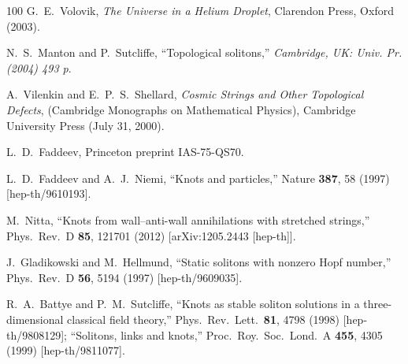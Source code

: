 \documentclass[aps,prd,preprint,
superscriptaddress]{revtex4}
\newcommand {\1}[1]{\frac{1}{#1}}
\newcommand {\2}[1]{\frac{i}{#1}}
\begin{document}

\newcommand{\J}[4]{{\sl #1} {\bf #2} (#3) #4}
\newcommand{\andJ}[3]{{\bf #1} (#2) #3}
\newcommand{\AP}{Ann.\ Phys.\ (N.Y.)}
\newcommand{\MPL}{Mod.\ Phys.\ Lett.}
\newcommand{\NP}{Nucl.\ Phys.}
\newcommand{\PL}{Phys.\ Lett.}
\newcommand{\PR}{ Phys.\ Rev.}
\newcommand{\PRL}{Phys.\ Rev.\ Lett.}
\newcommand{\PTP}{Prog.\ Theor.\ Phys.}
\newcommand{\hep}[1]{{\tt hep-th/{#1}}}



\begin{thebibliography}{100}
G.~E.~Volovik,
{\it The Universe in a Helium Droplet}, 
Clarendon Press,  Oxford (2003).

  N.~S.~Manton and P.~Sutcliffe,
  ``Topological solitons,''
{\it  Cambridge, UK: Univ. Pr. (2004) 493 p}.

A.~Vilenkin and E.~P.~S.~Shellard, 
{\it Cosmic Strings and Other Topological Defects}, (Cambridge Monographs on Mathematical Physics), Cambridge University Press (July 31, 2000).

L.~D.~Faddeev, Princeton preprint IAS-75-QS70.

  L.~D.~Faddeev and A.~J.~Niemi,
  ``Knots and particles,''  Nature {\bf 387}, 58 (1997)  [hep-th/9610193].  %

  M.~Nitta,
  ``Knots from wall--anti-wall annihilations with stretched strings,''  Phys.\ Rev.\ D {\bf 85}, 121701 (2012)  [arXiv:1205.2443 [hep-th]].  %

  J.~Gladikowski and M.~Hellmund,
  ``Static solitons with nonzero Hopf number,''  Phys.\ Rev.\ D {\bf 56}, 5194 (1997)  [hep-th/9609035].  %

  R.~A.~Battye and P.~M.~Sutcliffe,
  ``Knots as stable soliton solutions in a three-dimensional classical field theory,''  Phys.\ Rev.\ Lett.\  {\bf 81}, 4798 (1998)  [hep-th/9808129];  %
  ``Solitons, links and knots,''  Proc.\ Roy.\ Soc.\ Lond.\ A {\bf 455}, 4305 (1999)  [hep-th/9811077].  %


\end{thebibliography}
\end{document}
